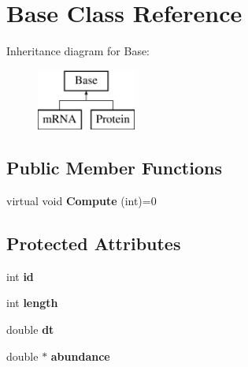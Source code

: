 \hypertarget{class_base}{\section{Base Class Reference}
\label{class_base}
}
Inheritance diagram for Base\-:\begin{figure}[H]
\begin{center}
\leavevmode
\includegraphics[height=2.000000cm]{class_base}
\end{center}
\end{figure}
\subsection*{Public Member Functions}
\begin{DoxyCompactItemize}
\item 
\hypertarget{class_base_a2539be60a003bf1153a87444870cfc50}{virtual void {\bfseries Compute} (int)=0}\label{class_base_a2539be60a003bf1153a87444870cfc50}

\end{DoxyCompactItemize}
\subsection*{Protected Attributes}
\begin{DoxyCompactItemize}
\item 
\hypertarget{class_base_af46b05bd03228ba15d40a05c15abffa0}{int {\bfseries id}}\label{class_base_af46b05bd03228ba15d40a05c15abffa0}

\item 
\hypertarget{class_base_afc939d650ee448e4b9e9302fdd8e6dae}{int {\bfseries length}}\label{class_base_afc939d650ee448e4b9e9302fdd8e6dae}

\item 
\hypertarget{class_base_a4c2c4261e4f2d0e7ebaf93bde00d3a26}{double {\bfseries dt}}\label{class_base_a4c2c4261e4f2d0e7ebaf93bde00d3a26}

\item 
\hypertarget{class_base_a262c09f4273320c819d77ec15a895980}{double $\ast$ {\bfseries abundance}}\label{class_base_a262c09f4273320c819d77ec15a895980}

\end{DoxyCompactItemize}
